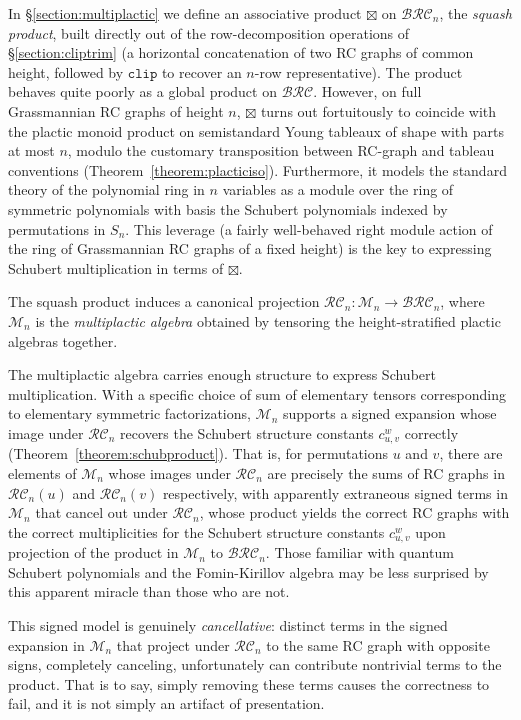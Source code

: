 \documentclass{amsart}
\theoremstyle{definition}
\theoremstyle{remark}
\numberwithin{equation}{subsection}
\newcommand{\clp}{\mathtt{clip}}
\newcommand{\BRC}{\mathcal{BRC}}
\newcommand{\RC}{\mathcal{RC}}
\begin{document}
In \S\ref{section:multiplactic} we define an associative product $\boxtimes$ on $\BRC_n$, the \emph{squash product}, built directly out of the row-decomposition operations of \S\ref{section:cliptrim} (a horizontal concatenation of two RC graphs of common height, followed by $\clp$ to recover an $n$-row representative). The product behaves quite poorly as a global product on $\BRC$. However, on full Grassmannian RC graphs of height $n$, $\boxtimes$ turns out fortuitously to coincide with the plactic monoid product on semistandard Young tableaux of shape with parts at most $n$, modulo the customary transposition between RC-graph and tableau conventions (Theorem~\ref{theorem:placticiso}). Furthermore, it models the standard theory of the polynomial ring in $n$ variables as a module over the ring of symmetric polynomials with basis the Schubert polynomials indexed by permutations in $S_n$. This leverage (a fairly well-behaved right module action of the ring of Grassmannian RC graphs of a fixed height) is the key to expressing Schubert multiplication in terms of $\boxtimes$. 

The squash product induces a canonical projection $\RC_n:\mathcal{M}_n\to\BRC_n$, where $\mathcal{M}_n$ is the \emph{multiplactic algebra} obtained by tensoring the height-stratified plactic algebras together.

The multiplactic algebra carries enough structure to express Schubert multiplication. With a specific choice of sum of elementary tensors corresponding to elementary symmetric factorizations, $\mathcal{M}_n$ supports a signed expansion whose image under $\RC_n$ recovers the Schubert structure constants $c_{u,v}^w$ correctly (Theorem~\ref{theorem:schubproduct}). That is, for permutations $u$ and $v$, there are elements of $\mathcal{M}_n$ whose images under $\RC_n$ are precisely the sums of RC graphs in $\RC_n(u)$ and $\RC_n(v)$ respectively, with apparently extraneous signed terms in $\mathcal{M}_n$ that cancel out under $\RC_n$, whose product yields the correct RC graphs with the correct multiplicities for the Schubert structure constants $c_{u,v}^w$ upon projection of the product in $\mathcal{M}_n$ to $\BRC_n$. Those familiar with quantum Schubert polynomials and the Fomin-Kirillov algebra may be less surprised by this apparent miracle than those who are not.


This signed model is genuinely \emph{cancellative}: distinct terms in the signed expansion in $\mathcal{M}_n$ that project under $\RC_n$ to the same RC graph with opposite signs, completely canceling, unfortunately can contribute nontrivial terms to the product. That is to say, simply removing these terms causes the correctness to fail, and it is not simply an artifact of presentation.
\end{document}
